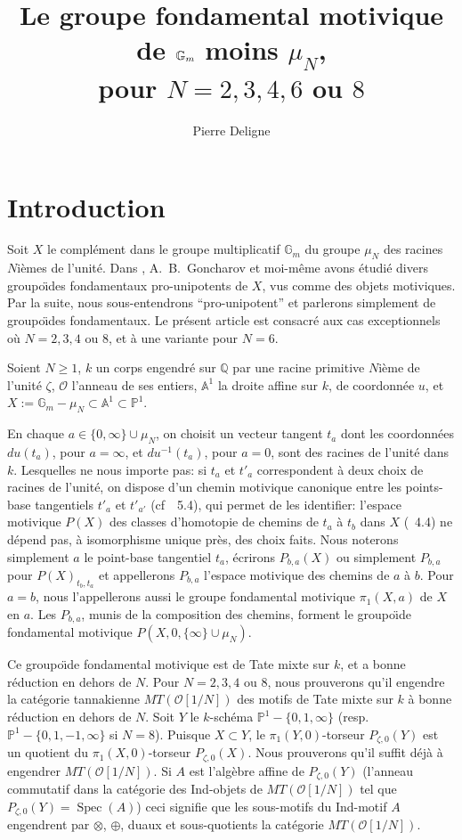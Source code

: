 \documentclass[11pt,a4paper]{article}
\title{Le groupe fondamental motivique de $\Gm$ moins $\mu_N$,\\pour $N=2,3,4,6$ ou $8$}
\author{Pierre Deligne}
\date{}
\theoremstyle{plain}
\theoremstyle{definition}
\DeclareMathOperator{\Spec}{Spec}
\newcommand{\Gm}{\mathbb{G}_m}
\newcommand{\Q}{\mathbb{Q}}
\newcommand{\A}{\mathbb{A}}
\newcommand{\Pone}{\mathbb{P}^1}
\begin{document}
\maketitle

\tableofcontents

\section{Introduction}
\label{sec:0}

Soit $X$ le compl\'ement dans le groupe multiplicatif $\Gm$ du groupe $\mu_N$ des racines $N$i\`emes de l'unit\'e. Dans \cite{1}, A.~B.~Goncharov et moi-m\^eme avons \'etudi\'e divers groupo\"{\i}des fondamentaux pro-unipotents de $X$, vus comme des objets motiviques. Par la suite, nous sous-entendrons ``pro-unipotent'' et parlerons simplement de groupo\"{\i}des fondamentaux. Le pr\'esent article est consacr\'e aux cas exceptionnels o\`u $N = 2,3,4$ ou $8$, et \`a une variante pour $N=6$.

Soient $N \geq 1$, $k$ un corps engendr\'e sur $\Q$ par une racine primitive $N$i\`eme de l'unit\'e $\zeta$, $\mathcal{O}$ l'anneau de ses entiers, $\A^1$ la droite affine sur $k$, de coordonn\'ee $u$, et $X := \Gm - \mu_N \subset \A^1 \subset \Pone$.

En chaque $a \in \{0, \infty\} \cup \mu_N$, on choisit un vecteur tangent $t_a$ dont les coordonn\'ees $du(t_a)$, pour $a=\infty$, et $du^{-1}(t_a)$, pour $a=0$, sont des racines de l'unit\'e dans $k$. Lesquelles ne nous importe pas: si $t_a$ et $t'_a$ correspondent \`a deux choix de racines de l'unit\'e, on dispose d'un chemin motivique canonique entre les points-base tangentiels $t'_a$ et $t'_{a'}$ (cf~\cite{1}~5.4), qui permet de les identifier: l'espace motivique $P(X)$ des classes d'homotopie de chemins de $t_a$ \`a $t_b$ dans $X$ (\cite{1}~4.4) ne d\'epend pas, \`a isomorphisme unique pr\`es, des choix faits. Nous noterons simplement $a$ le point-base tangentiel $t_a$, \'ecrirons $P_{b,a}(X)$ ou simplement $P_{b,a}$ pour $P(X)_{t_b,t_a}$ et appellerons $P_{b,a}$ l'espace motivique des chemins de $a$ \`a $b$. Pour $a=b$, nous l'appellerons aussi le groupe fondamental motivique $\pi_1(X,a)$ de $X$ en $a$. Les $P_{b,a}$, munis de la composition des chemins, forment le groupo\"{\i}de fondamental motivique $P(X,0,\{\infty\} \cup \mu_N)$.

Ce groupo\"{\i}de fondamental motivique est de Tate mixte sur $k$, et a bonne r\'eduction en dehors de $N$. Pour $N = 2,3,4$ ou $8$, nous prouverons qu'il engendre la cat\'egorie tannakienne $MT(\mathcal{O}[1/N])$ des motifs de Tate mixte sur $k$ \`a bonne r\'eduction en dehors de $N$. Soit $Y$ le $k$-sch\'ema $\Pone - \{0,1,\infty\}$ (resp.~$\Pone - \{0,1,-1,\infty\}$ si $N=8$). Puisque $X \subset Y$, le $\pi_1(Y,0)$-torseur $P_{\zeta,0}(Y)$ est un quotient du $\pi_1(X,0)$-torseur $P_{\zeta,0}(X)$. Nous prouverons qu'il suffit d\'ej\`a \`a engendrer $MT(\mathcal{O}[1/N])$. Si $A$ est l'alg\`ebre affine de $P_{\zeta,0}(Y)$ (l'anneau commutatif dans la cat\'egorie des Ind-objets de $MT(\mathcal{O}[1/N])$ tel que $P_{\zeta,0}(Y) = \Spec(A)$) ceci signifie que les sous-motifs du Ind-motif $A$ engendrent par $\otimes$, $\oplus$, duaux et sous-quotients la cat\'egorie $MT(\mathcal{O}[1/N])$.
\end{document}
